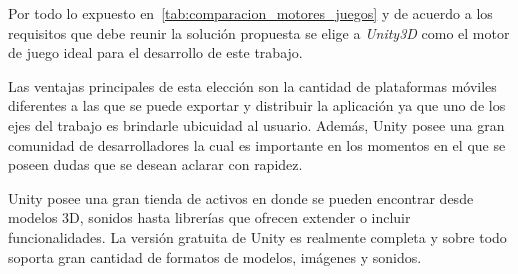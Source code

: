 \restoregeometry

Por todo lo expuesto en~\ref{tab:comparacion_motores_juegos} y de acuerdo a los
requisitos que debe reunir la solución propuesta se elige a \textit{Unity3D} como el
motor de juego ideal para el desarrollo de este trabajo.

Las ventajas principales  de esta elección son
la cantidad de plataformas móviles diferentes a las que se puede exportar y
distribuir la aplicación ya que uno de los ejes del trabajo es brindarle
ubicuidad al usuario. Además, Unity posee una gran comunidad de desarrolladores
la cual es importante en los momentos en el que se poseen dudas que se desean
aclarar con rapidez.

Unity posee una gran tienda de activos en donde se pueden encontrar desde
modelos 3D, sonidos hasta librerías que ofrecen extender o incluir
funcionalidades. La versión gratuita de Unity es realmente completa y sobre todo
soporta gran cantidad de formatos de modelos, imágenes y sonidos.
